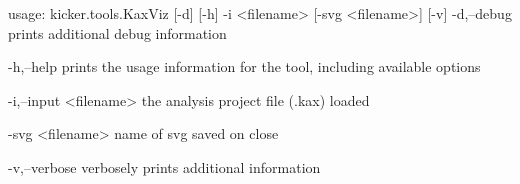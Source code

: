 usage: kicker.tools.KaxViz [-d] [-h] -i <filename> [-svg <filename>] [-v]
 -d,--debug
        prints additional debug information

 -h,--help
        prints the usage information for the tool, including available
        options

 -i,--input <filename>
        the analysis project file (.kax) loaded

 -svg <filename>
        name of svg saved on close

 -v,--verbose
        verbosely prints additional information